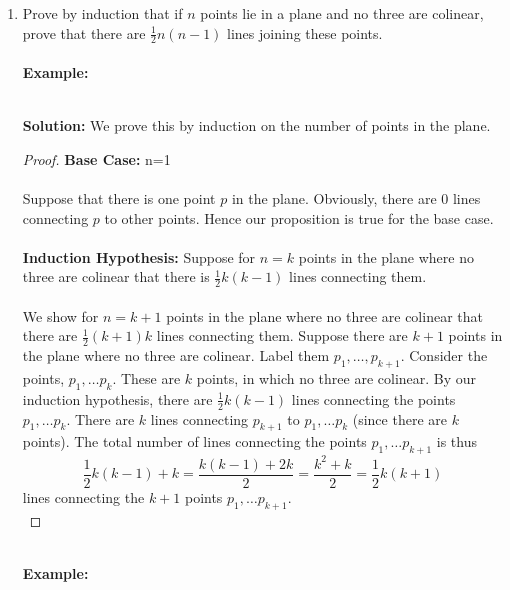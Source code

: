 \documentclass[12pt,letterpaper]{article}
\theoremstyle{plain}
\theoremstyle{definition}
\begin{document}
\begin{enumerate}[1.]
\begin{proof}
\end{proof}
\newpage
\item Prove by induction that if $n$ points lie in a plane and no three are colinear, prove that there are $\frac{1}{2}n(n-1)$ lines joining these points. \\
\ \\
{\bf Example: }
\begin{center}
\end{center}
\ \\
{\bf Solution:} We prove this by induction on the number of points in the plane.
\begin{proof}
{\bf Base Case:} n=1\\
\ \\
Suppose that there is one point $p$ in the plane. Obviously, there are $0$ lines connecting $p$ to other points. Hence our proposition is true for the base case.\\
\ \\
{\bf Induction Hypothesis:} Suppose for $n=k$ points in the plane where no three are colinear that there is $\frac{1}{2}k(k-1)$ lines connecting them. \\
\ \\
We show for $n=k+1$ points in the plane where no three are colinear that there are $\frac{1}{2}(k+1)k$ lines connecting them. Suppose there are $k+1$ points in the plane where  no three are colinear. Label them $p_1, \ldots, p_{k+1}$. Consider the points, $p_1, \ldots p_k$. These are $k$ points, in which no three are colinear. By our induction hypothesis, there are $\frac{1}{2}k(k-1)$ lines connecting the points $p_1,\ldots p_k$.  There are $k$ lines connecting $p_{k+1}$ to $p_1,\ldots p_k$ (since there are $k$ points). The total number of lines connecting the points $p_1,\ldots p_{k+1}$ is thus 
\[\frac{1}{2}k(k-1)+k=\frac{k(k-1)+2k}{2}=\frac{k^2+k}{2}=\frac{1}{2}k(k+1)\]
lines connecting the $k+1$ points $p_{1},\ldots p_{k+1}$.\\
\end{proof}
\ \\
{\bf Example: }
\begin{center}
\end{center}



\end{enumerate}
\end{document}
